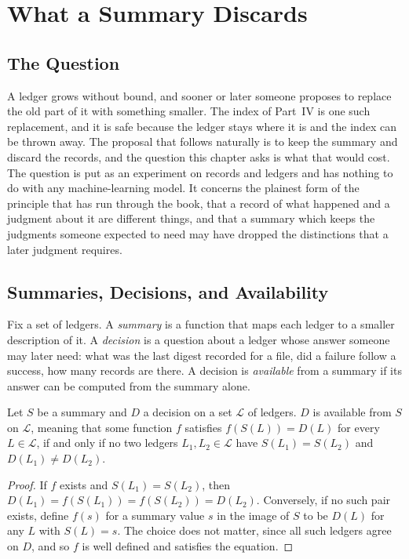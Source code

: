 \chapter{What a Summary Discards}
\label{ch:compression}

\section{The Question}

A ledger grows without bound, and sooner or later someone proposes to replace the old part of it with something smaller. The index of Part~IV is one such replacement, and it is safe because the ledger stays where it is and the index can be thrown away. The proposal that follows naturally is to keep the summary and discard the records, and the question this chapter asks is what that would cost. The question is put as an experiment on records and ledgers and has nothing to do with any machine-learning model. It concerns the plainest form of the principle that has run through the book, that a record of what happened and a judgment about it are different things, and that a summary which keeps the judgments someone expected to need may have dropped the distinctions that a later judgment requires.

\section{Summaries, Decisions, and Availability}

Fix a set of ledgers. A \emph{summary} is a function that maps each ledger to a smaller description of it. A \emph{decision} is a question about a ledger whose answer someone may later need: what was the last digest recorded for a file, did a failure follow a success, how many records are there. A decision is \emph{available} from a summary if its answer can be computed from the summary alone.

\begin{proposition}\label{prop:available}
Let $S$ be a summary and $D$ a decision on a set $\mathcal{L}$ of ledgers. $D$ is available from $S$ on $\mathcal{L}$, meaning that some function $f$ satisfies $f(S(L)) = D(L)$ for every $L \in \mathcal{L}$, if and only if no two ledgers $L_1, L_2 \in \mathcal{L}$ have $S(L_1) = S(L_2)$ and $D(L_1) \neq D(L_2)$.
\end{proposition}

\begin{proof}
If $f$ exists and $S(L_1) = S(L_2)$, then $D(L_1) = f(S(L_1)) = f(S(L_2)) = D(L_2)$. Conversely, if no such pair exists, define $f(s)$ for a summary value $s$ in the image of $S$ to be $D(L)$ for any $L$ with $S(L) = s$. The choice does not matter, since all such ledgers agree on $D$, and so $f$ is well defined and satisfies the equation.
\end{proof}

